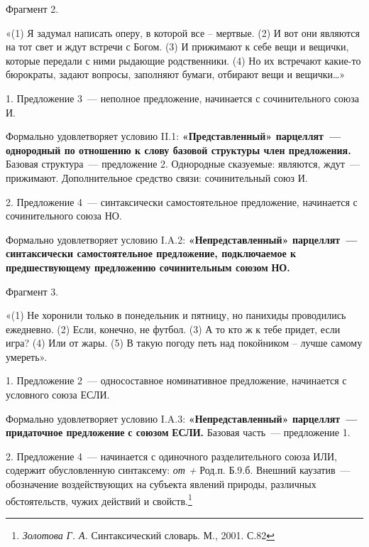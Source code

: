 \documentclass{kursa4}
\begin{document}
      {Фрагмент 2. }

      {«(1) Я задумал написать оперу, в которой все – мертвые. (2) И вот они являются на тот свет и ждут встречи с Богом. (3) И прижимают к себе вещи и вещички, которые передали с ними рыдающие родственники. (4) Но их встречают какие-то бюрократы, задают вопросы, заполняют бумаги, отбирают вещи и вещички…»}

      {1. Предложение 3~--- неполное предложение, начинается с сочинительного союза И.}

      {Формально удовлетворяет условию II.1:
      }\textbf{{«Представленный» парцеллят~--- однородный по отношению к слову базовой структуры член предложения.
      }}{Базовая структура~--- предложение 2. Однородные сказуемые: являются, ждут~--- прижимают. Дополнительное средство связи: сочинительный союз И.}

      {2. Предложение 4~--- синтаксически самостоятельное предложение, начинается с сочинительного союза НО.}



      {Формально удовлетворяет условию I.A.2:
      }\textbf{{«Непредставленный» п}}\textbf{{арцеллят~--- синтаксически самостоятельное предложение, подключаемое к предшествующему предложению сочинительным союз}}\textbf{{ом}}\textbf{\textit{{
      }}}\textbf{{НО.}}


      \bigskip

      {Фрагмент 3.}

      {«(1) Не хоронили только в понедельник и пятницу, но панихиды проводились ежедневно. (2) Если, конечно, не футбол. (3) А то кто ж к тебе придет, если игра? (4) Или от жары. (5)
      }{В такую погоду петь над покойником – лучше самому умереть».}

      {1. Предложение 2~--- односоставное номинативное предложение, начинается с условного союза ЕСЛИ.}

      {Формально удовлетворяет условию I.A.3:
      }\textbf{{«Непредставленный» парцеллят~--- придаточное предложение }}\textbf{{с союзом
      }}\textbf{{ЕСЛИ}}\textbf{{.
      }}{Базовая часть~--- предложение 1. }

      {2. Предложение 4~--- начинается с одиночного разделительного союза ИЛИ, содержит обусловленную синтаксему:
      }\textit{{от + }}{Род.п. Б.9.б. Внешний каузатив~--- обозначение воздействующих на субъекта явлений природы, различных обстоятельств, чужих действий и свойств.}\footnote{\textit{{ Золотова Г. А. }}{Синтаксический словарь. М., 2001. С.82}}{ }
\end{document}
